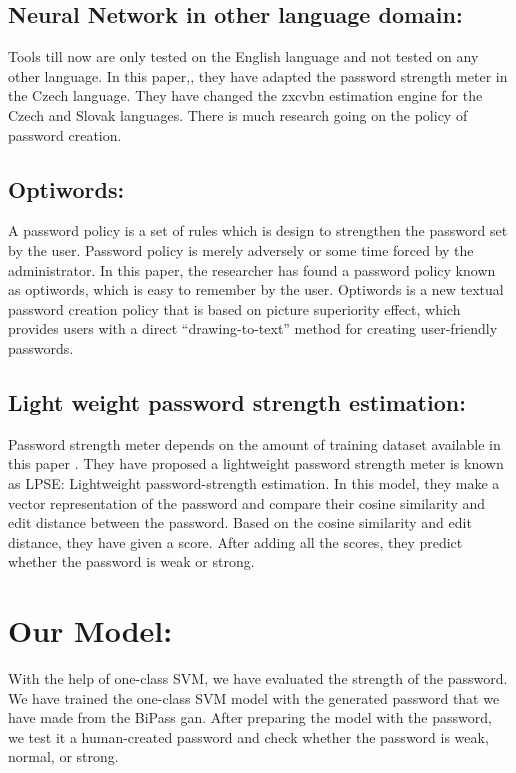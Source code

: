 \documentclass[runningheads]{llncs}
\begin{document}
\subsection{Neural Network in other language domain:}
Tools till now are only tested on the English language and not tested on any other language. In this paper,\cite{article}, they have adapted the password strength meter in the Czech language. They have changed the zxcvbn estimation engine for the Czech and Slovak languages.
There is much research going on the policy of password creation. 
\subsection{Optiwords:}
A password policy is a set of rules which is design to strengthen the password set by the user. Password policy is merely adversely or some time forced by the administrator.
In this paper, \cite{GUO2019423}the researcher has found a password policy known as optiwords, which is easy to remember by the user.  Optiwords is a new textual password creation policy that is based on picture superiority effect, which provides users with a direct “drawing-to-text” method for creating user-friendly passwords. 
\subsection{Light weight password strength estimation:}
Password strength meter depends on the amount of training dataset available in this paper \cite{Guo2018LPSELP}. They have proposed a lightweight password strength meter is known as LPSE: Lightweight password-strength estimation. In this model, they make a vector representation of the password and compare their cosine similarity and edit distance between the password. Based on the cosine similarity and edit distance, they have given a score. After adding all the scores, they predict whether the password is weak or strong.
\section{Our Model:}
With the help of one-class SVM, we have evaluated the strength of the password. We have trained the one-class SVM model\cite{1437839} with the generated password that we have made from the BiPass gan. After preparing the model with the password, we test it a human-created password and check whether the password is weak, normal, or strong.
\newline
\hfill \break
\end{document}
